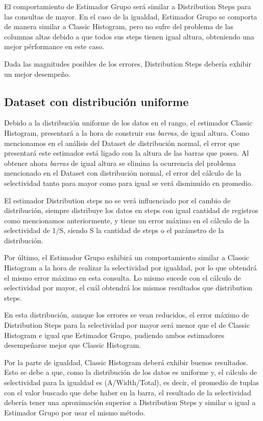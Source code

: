 \documentclass[a4paper, 10pt, twoside]{article}
\begin{document}
El comportamiento de Estimador Grupo será similar a Distribution Steps para las consultas de mayor. En el caso de la igualdad, Estimador Grupo se comporta de manera similar a Classic Histogram, pero no sufre del problema de las columnas altas debido a que todos sus steps tienen igual altura, obteniendo una mejor pérformance en este caso.

Dada las magnitudes posibles de los errores, Distribution Steps debería exhibir un mejor desempeño.

\subsection{Dataset con distribución uniforme}

Debido a la distribución uniforme de los datos en el rango, el estimador Classic Histogram, presentará a la hora de construir sus \textit{barras}, de igual altura. Como mencionamos en el análisis del Dataset de distribución normal, el error que presentará este estimador está ligado con la altura de las barras que posea. Al obtener ahora \textit{barras} de igual altura se elimina la ocurrencia del problema mencionado en el Dataset con distribución normal, el error del cálculo de la selectividad tanto para mayor como para igual se verá disminuído en promedio. 

El estimador Distribution steps no se verá influenciado por el cambio de distribución, siempre distribuye los datos en steps con igual cantidad de registros como mencionamos anteriormente, y tiene un error máximo en el cálculo de la selectividad de 1/S, siendo S la cantidad de steps o el parámetro de la distribución.

Por último, el Estimador Grupo exhibirá un comportamiento similar a Classic Histogram a la hora de realizar la selectividad por igualdad, por lo que obtendrá el mismo error máximo en esta consulta. Lo mismo sucede con el cálculo de selectividad por mayor, el cuál obtendrá los mismos resultados que distribution steps.

En esta distribución, aunque los errores se vean reducidos, el error máximo de Distribution Steps para la selectividad por mayor será menor que el de Classic Histogram e igual que Estimador Grupo, pudiendo ambos estimadores desempeñarse mejor que Classic Histogram.

Por la parte de igualdad, Classic Histogram deberá exhibir buenos resultados. Esto se debe a que, como la distribución de los datos es uniforme y, el cálculo de selectividad para la igualdad es (A/Width/Total), es decir, el promedio de tuplas con el valor buscado que debe haber en la barra, el resultado de la selectividad debería tener una aproximación superior a Distribution Steps y similar o igual a Estimador Grupo por usar el mismo método.
\end{document}
